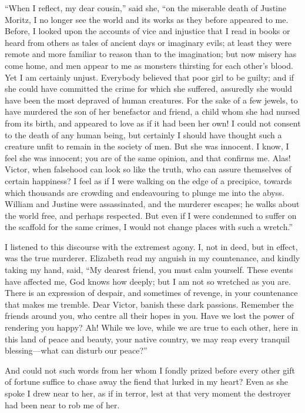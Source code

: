 \documentclass[12pt,openright]{book}
\begin{document}
“When I reflect, my dear cousin,” said she, “on the miserable death of Justine Moritz, I no longer see the world and its works as they before appeared to me. Before, I looked upon the accounts of vice and injustice that I read in books or heard from others as tales of ancient days or imaginary evils; at least they were remote and more familiar to reason than to the imagination; but now misery has come home, and men appear to me as monsters thirsting for each other’s blood. Yet I am certainly unjust. Everybody believed that poor girl to be guilty; and if she could have committed the crime for which she suffered, assuredly she would have been the most depraved of human creatures. For the sake of a few jewels, to have murdered the son of her benefactor and friend, a child whom she had nursed from its birth, and appeared to love as if it had been her own! I could not consent to the death of any human being, but certainly I should have thought such a creature unfit to remain in the society of men. But she was innocent. I know, I feel she was innocent; you are of the same opinion, and that confirms me. Alas! Victor, when falsehood can look so like the truth, who can assure themselves of certain happiness? I feel as if I were walking on the edge of a precipice, towards which thousands are crowding and endeavouring to plunge me into the abyss. William and Justine were assassinated, and the murderer escapes; he walks about the world free, and perhaps respected. But even if I were condemned to suffer on the scaffold for the same crimes, I would not change places with such a wretch.”

I listened to this discourse with the extremest agony. I, not in deed, but in effect, was the true murderer. Elizabeth read my anguish in my countenance, and kindly taking my hand, said, “My dearest friend, you must calm yourself. These events have affected me, God knows how deeply; but I am not so wretched as you are. There is an expression of despair, and sometimes of revenge, in your countenance that makes me tremble. Dear Victor, banish these dark passions. Remember the friends around you, who centre all their hopes in you. Have we lost the power of rendering you happy? Ah! While we love, while we are true to each other, here in this land of peace and beauty, your native country, we may reap every tranquil blessing—what can disturb our peace?”

And could not such words from her whom I fondly prized before every other gift of fortune suffice to chase away the fiend that lurked in my heart? Even as she spoke I drew near to her, as if in terror, lest at that very moment the destroyer had been near to rob me of her.
\end{document}
